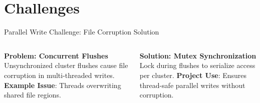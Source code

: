 \documentclass[aspectratio=169]{beamer}
\begin{document}
\section{Challenges}
\begin{frame}{Parallel Write Challenge: File Corruption Solution}
  \begin{columns}
    \textbf{Problem: Concurrent Flushes}
    \small Unsynchronized cluster flushes cause file corruption in multi-threaded writes.
    \vspace{0.5em}
    \textbf{Example Issue}: Threads overwriting shared file regions.

    \textbf{Solution: Mutex Synchronization}
    \small Lock during flushes to serialize access per cluster.
    \vspace{0.5em}
    \vspace{0.5em}
    \textbf{Project Use}: Ensures thread-safe parallel writes without corruption.
  \end{columns}
\end{frame}
\end{document}

